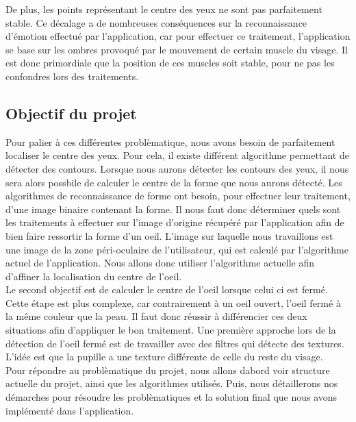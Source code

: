 De plus, les points représentant le centre des yeux ne sont pas parfaitement stable. Ce décalage a de 
nombreuses conséquences sur la reconnaissance d'émotion effectué par l'application, car pour effectuer
ce traitement, l'application se base sur les ombres provoqué par le mouvement de certain muscle du 
visage. Il est donc primordiale que la position de ces muscles soit stable, pour ne pas les confondres
lors des traitements.\\

\subsection{Objectif du projet}
Pour palier à ces différentes problèmatique, nous avons besoin de parfaitement localiser le centre des
yeux. Pour cela, il existe différent algorithme permettant de détecter des contours. Lorsque nous aurons
détecter les contours des yeux, il nous sera alors possbile de calculer le centre de la forme
que nous aurons détecté. Les algorithmes de reconnaissance de forme ont besoin, pour effectuer leur traitement,
d'une image binaire contenant la forme. Il nous faut donc déterminer quels sont les traitements à effectuer
sur l'image d'origine récupéré par l'application afin de bien faire ressortir la forme d'un oeil. L'image
sur laquelle nous travaillons est une image de la zone péri-oculaire de l'utilisateur, qui est calculé par
l'algorithme actuel de l'application. Nous allons donc utiliser l'algorithme actuelle afin d'affiner la localisation
du centre de l'oeil.\\

Le second objectif est de calculer le centre de l'oeil lorsque celui ci est fermé. Cette étape est plus complexe,
car contrairement à un oeil ouvert, l'oeil fermé à la même couleur que la peau. Il faut donc réussir à différencier ces
deux situations afin d'appliquer le bon traitement. Une première approche lors de la détection de l'oeil fermé est 
de travailler avec des filtres qui détecte des textures. L'idée est que la pupille a une texture différente de celle 
du reste du visage.\\

Pour répondre au problèmatique du projet, nous allons dabord voir structure actuelle du projet, ainsi que les algorithmes
utilisés. Puis, nous détaillerons nos démarches pour résoudre les problèmatiques et la solution final que nous avons
implémenté dans l'application.

\newpage

